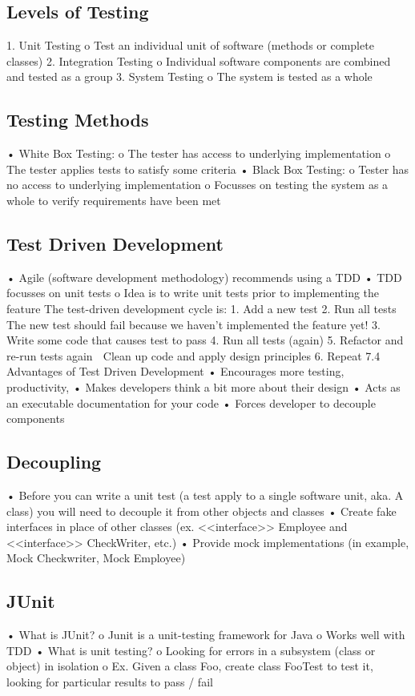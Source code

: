 \documentclass[11pt]{article}
\begin{document}
{{\subsection{Levels of Testing}
1. Unit Testing
o Test an individual unit of software (methods or complete classes)
2. Integration Testing
o Individual software components are combined and tested as a group
3. System Testing
o The system is tested as a whole
\subsection{Testing Methods}
• White Box Testing:
o The tester has access to underlying implementation
o The tester applies tests to satisfy some criteria
• Black Box Testing:
o Tester has no access to underlying implementation
o Focusses on testing the system as a whole to verify requirements have been met
\subsection{Test Driven Development}
• Agile (software development methodology) recommends using a TDD
• TDD focusses on unit tests
o Idea is to write unit tests prior to implementing the feature
The test-driven development cycle is:
1. Add a new test
2. Run all tests
 The new test should fail because we haven’t implemented the feature yet!
3. Write some code that causes test to pass
4. Run all tests (again)
5. Refactor and re-run tests again
 Clean up code and apply design principles
6. Repeat
7.4 Advantages of Test Driven Development
• Encourages more testing, productivity,
• Makes developers think a bit more about their design
• Acts as an executable documentation for your code
• Forces developer to decouple components 
\subsection{Decoupling}
• Before you can write a unit test (a test apply to a single software unit, aka. A class) you will need to
decouple it from other objects and classes
• Create fake interfaces in place of other classes (ex. <<interface>> Employee and <<interface>>
CheckWriter, etc.)
• Provide mock implementations (in example, Mock Checkwriter, Mock Employee)
\subsection{JUnit}
• What is JUnit?
o Junit is a unit-testing framework for Java
o Works well with TDD
• What is unit testing?
o Looking for errors in a subsystem (class or object) in isolation
o Ex. Given a class Foo, create class FooTest to test it, looking for particular results to
pass / fail
}}
\end{document}
